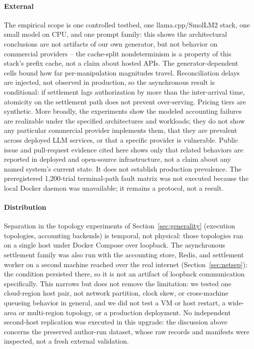 \documentclass[manuscript,review,anonymous]{acmart}
\begin{document}
\paragraph{External}
The empirical scope is one controlled testbed, one llama.cpp/SmolLM2 stack, one small
model on CPU, and one prompt family: this shows the
architectural conclusions are not artifacts of our own generator, but not behavior on
commercial providers -- the cache-split nondeterminism is a property of this stack's
prefix cache, not a claim about hosted APIs. The generator-dependent cells bound how far
per-manipulation magnitudes travel. Reconciliation delays are injected, not observed in
production, so the asynchronous result is conditional: if settlement lags authorization by
more than the inter-arrival time, atomicity on the settlement path does not prevent
over-serving. Pricing tiers are synthetic. More broadly, the experiments show the modeled
accounting failures are realizable under the specified architectures and workloads; they
do not show any particular commercial provider implements them, that they are prevalent
across deployed LLM services, or that a specific provider is vulnerable. Public issue and
pull-request evidence cited here shows only that related behaviors are reported in
deployed and open-source infrastructure, not a claim about any named system's current
state. It does not establish production prevalence. The preregistered 1,200-trial
terminal-path fault matrix was not executed because the local Docker daemon was
unavailable; it remains a protocol, not a result.

\paragraph{Distribution}
Separation in the topology experiments of Section~\ref{sec:generality} (execution
topologies, accounting backends) is temporal, not physical: those topologies ran on a
single host under Docker Compose over loopback. The asynchronous settlement family was
also run with the accounting store, Redis, and settlement worker on a second machine
reached over the real internet (Section~\ref{sec:netsep}); the condition persisted there,
so it is not an artifact of loopback communication specifically. This narrows but does
not remove the limitation: we tested one cloud-region
host pair, not network partition, clock skew, or cross-machine queueing behavior in
general, and we did not test a VM or host restart, a wide-area or multi-region topology,
or a production deployment. No independent second-host replication was executed in this
upgrade: the discussion above concerns the preserved author-run dataset, whose raw records
and manifests were inspected, not a fresh external validation.
\end{document}
